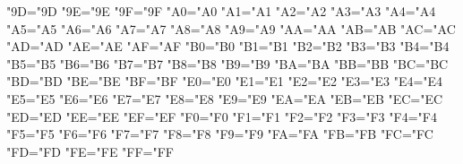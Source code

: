 \lccode"9D="9D %
\lccode"9E="9E %
\lccode"9F="9F %
\lccode"A0="A0 %
\lccode"A1="A1 %
\lccode"A2="A2 %
\lccode"A3="A3 %
\lccode"A4="A4 %
\lccode"A5="A5 %
\lccode"A6="A6 %
\lccode"A7="A7 %
\lccode"A8="A8 %
\lccode"A9="A9 %
\lccode"AA="AA %
\lccode"AB="AB %
\lccode"AC="AC %
\lccode"AD="AD %
\lccode"AE="AE %
\lccode"AF="AF %
\lccode"B0="B0 %
\lccode"B1="B1 %
\lccode"B2="B2 %
\lccode"B3="B3 %
\lccode"B4="B4 %
\lccode"B5="B5 %
\lccode"B6="B6 %
\lccode"B7="B7 %
\lccode"B8="B8 %
\lccode"B9="B9 %
\lccode"BA="BA %
\lccode"BB="BB %
\lccode"BC="BC %
\lccode"BD="BD %
\lccode"BE="BE %
\lccode"BF="BF %
\lccode"E0="E0 %
\lccode"E1="E1 %
\lccode"E2="E2 %
\lccode"E3="E3 %
\lccode"E4="E4 %
\lccode"E5="E5 %
\lccode"E6="E6 %
\lccode"E7="E7 %
\lccode"E8="E8 %
\lccode"E9="E9 %
\lccode"EA="EA %
\lccode"EB="EB %
\lccode"EC="EC %
\lccode"ED="ED %
\lccode"EE="EE %
\lccode"EF="EF %
\lccode"F0="F0 %
\lccode"F1="F1 %
\lccode"F2="F2 %
\lccode"F3="F3 %
\lccode"F4="F4 %
\lccode"F5="F5 %
\lccode"F6="F6 %
\lccode"F7="F7 %
\lccode"F8="F8 %
\lccode"F9="F9 %
\lccode"FA="FA %
\lccode"FB="FB %
\lccode"FC="FC %
\lccode"FD="FD %
\lccode"FE="FE %
\lccode"FF="FF %

